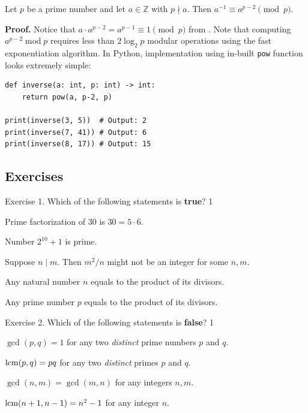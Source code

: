 \documentclass[../../book.tex]{subfiles}
\begin{document}
\begin{corollary}
    Let $p$ be a prime number and let $a \in \mathbb{Z}$ with $p \nmid a$. Then $a^{-1} \equiv a^{p-2} \pmod{p}$.
\end{corollary}

\textbf{Proof.} Notice that $a \cdot a^{p-2} = a^{p-1} \equiv 1 \pmod{p}$ from . 
Note that computing $a^{p-2} \; \text{mod} \; p$ requires less than $2\log_2p$ modular operations using 
the fast exponentiation algorithm. In Python, implementation using in-built \texttt{pow} function 
looks extremely simple:
\begin{verbatim}
def inverse(a: int, p: int) -> int:
    return pow(a, p-2, p)

print(inverse(3, 5))  # Output: 2
print(inverse(7, 41)) # Output: 6
print(inverse(8, 17)) # Output: 15
\end{verbatim}

\subsection{Exercises}

\begin{xexercise}
    {Exercise 1.}
    {Which of the following statements is \textbf{true}?}
    {1}
    {
        \item Prime factorization of $30$ is $30=5 \cdot 6$.
        \item Number $2^{10}+1$ is prime.
        \item Suppose $n \mid m$. Then $m^2/n$ might not be an integer for some $n,m$.
        \item Any natural number $n$ equals to the product of its divisors.
        \item Any prime number $p$ equals to the product of its divisors.
    }
\end{xexercise}

\begin{xexercise}
    {Exercise 2.}
    {Which of the following statements is \textbf{false}?}
    {1}
    {
        \item $\gcd(p,q)=1$ for any two \textit{distinct} prime numbers $p$ and $q$.
        \item $\text{lcm}(p,q)=pq$ for any two \textit{distinct} primes $p$ and $q$.
        \item $\gcd(n,m) = \gcd(m,n)$ for any integers $n,m$.
        \item $\text{lcm}(n+1,n-1) = n^2-1$ for any integer $n$.
    }
\end{xexercise}
\end{document}
